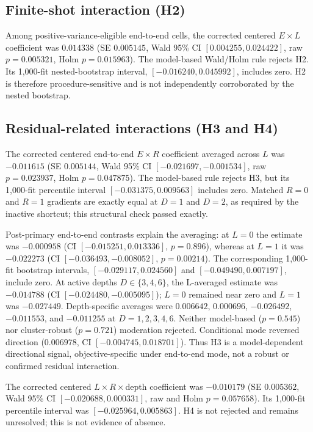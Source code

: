 \documentclass[pdflatex,sn-mathphys-num,Numbered]{sn-jnl}
\begin{document}
\subsection{Finite-shot interaction (H2)}\label{sec:h2-result}

Among positive-variance-eligible end-to-end cells, the corrected centered $E\times L$ coefficient was $0.014338$ (SE $0.005145$, Wald 95\% CI $[0.004255,0.024422]$, raw $p=0.005321$, Holm $p=0.015963$). The model-based Wald/Holm rule rejects H2. Its 1,000-fit nested-bootstrap interval, $[-0.016240,0.045992]$, includes zero. H2 is therefore procedure-sensitive and is not independently corroborated by the nested bootstrap.

\subsection{Residual-related interactions (H3 and H4)}\label{sec:residual-results}

The corrected centered end-to-end $E\times R$ coefficient averaged across $L$ was $-0.011615$ (SE $0.005144$, Wald 95\% CI $[-0.021697,-0.001534]$, raw $p=0.023937$, Holm $p=0.047875$). The model-based rule rejects H3, but its 1,000-fit percentile interval $[-0.031375,0.009563]$ includes zero. Matched $R=0$ and $R=1$ gradients are exactly equal at $D=1$ and $D=2$, as required by the inactive shortcut; this structural check passed exactly.

Post-primary end-to-end contrasts explain the averaging: at $L=0$ the estimate was $-0.000958$ (CI $[-0.015251,0.013336]$, $p=0.896$), whereas at $L=1$ it was $-0.022273$ (CI $[-0.036493,-0.008052]$, $p=0.00214$). The corresponding 1,000-fit bootstrap intervals, $[-0.029117,0.024560]$ and $[-0.049490,0.007197]$, include zero. At active depths $D\in\{3,4,6\}$, the L-averaged estimate was $-0.014788$ (CI $[-0.024480,-0.005095]$); $L=0$ remained near zero and $L=1$ was $-0.027449$. Depth-specific averages were $0.006642$, $0.000696$, $-0.026492$, $-0.011553$, and $-0.011255$ at $D=1,2,3,4,6$. Neither model-based ($p=0.545$) nor cluster-robust ($p=0.721$) moderation rejected. Conditional mode reversed direction ($0.006978$, CI $[-0.004745,0.018701]$). Thus H3 is a model-dependent directional signal, objective-specific under end-to-end mode, not a robust or confirmed residual interaction.

The corrected centered $L\times R\times$depth coefficient was $-0.010179$ (SE $0.005362$, Wald 95\% CI $[-0.020688,0.000331]$, raw and Holm $p=0.057658$). Its 1,000-fit percentile interval was $[-0.025964,0.005863]$. H4 is not rejected and remains unresolved; this is not evidence of absence.
\end{document}
